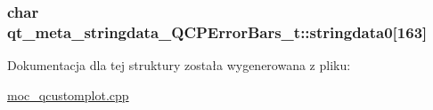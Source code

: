 \subsubsection[{\texorpdfstring{stringdata0}{stringdata0}}]{\setlength{\rightskip}{0pt plus 5cm}char qt\+\_\+meta\+\_\+stringdata\+\_\+\+Q\+C\+P\+Error\+Bars\+\_\+t\+::stringdata0\mbox{[}163\mbox{]}}\hypertarget{structqt__meta__stringdata___q_c_p_error_bars__t_a651dca586cf4ad7d2d0c36d8723c59b2}{}\label{structqt__meta__stringdata___q_c_p_error_bars__t_a651dca586cf4ad7d2d0c36d8723c59b2}


Dokumentacja dla tej struktury została wygenerowana z pliku\+:\begin{DoxyCompactItemize}
\item 
\hyperlink{moc__qcustomplot_8cpp}{moc\+\_\+qcustomplot.\+cpp}\end{DoxyCompactItemize}
